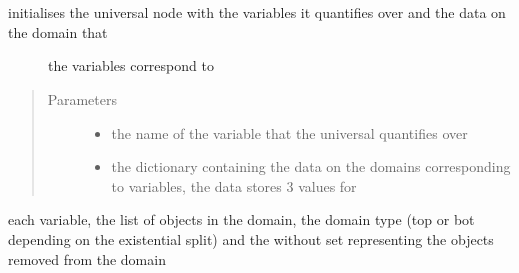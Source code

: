 \documentclass[letterpaper,10pt,english,openany,oneside]{sphinxmanual}
\begin{document}

\begin{fulllineitems}
\label{\detokenize{index:circuit.ForAllNode}}~

\begin{fulllineitems}
\label{\detokenize{index:circuit.ForAllNode.__init__}}~\begin{description}
\item[{initialises the universal node with the variables it quantifies over and the data on the domain that }] \leavevmode
the variables correspond to

\end{description}
\begin{quote}\begin{description}
\item[{Parameters}] \leavevmode\begin{itemize}
\item {} 
 \textendash{} the name of the variable that the universal quantifies over

\item {} 
 \textendash{} the dictionary containing the data on the domains corresponding to variables, the data stores 3 values for

\end{itemize}

\end{description}\end{quote}

each variable, the list of objects in the domain, the domain type (top or bot depending on the existential split) and the without set 
representing the objects removed from the domain

\end{fulllineitems}


\end{fulllineitems}
\end{document}
